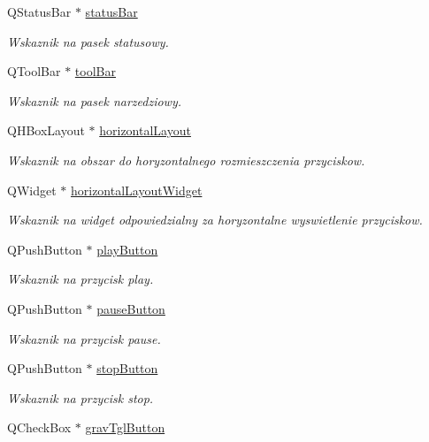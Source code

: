 \begin{DoxyCompactItemize}
Q\-Status\-Bar $\ast$ \hyperlink{class_okno_glowne_a40a10989bc6b318ac24e2457d7adb53b}{status\-Bar}
\begin{DoxyCompactList}\small\item\em Wskaznik na pasek statusowy. \end{DoxyCompactList}\item 
Q\-Tool\-Bar $\ast$ \hyperlink{class_okno_glowne_a6a37dd1f32605092fff7feac712bf429}{tool\-Bar}
\begin{DoxyCompactList}\small\item\em Wskaznik na pasek narzedziowy. \end{DoxyCompactList}\item 
Q\-H\-Box\-Layout $\ast$ \hyperlink{class_okno_glowne_aacb5ddb6d0eb560a47917cc1b457239a}{horizontal\-Layout}
\begin{DoxyCompactList}\small\item\em Wskaznik na obszar do horyzontalnego rozmieszczenia przyciskow. \end{DoxyCompactList}\item 
Q\-Widget $\ast$ \hyperlink{class_okno_glowne_a12ac2d00b9ca186176ccc710a928a723}{horizontal\-Layout\-Widget}
\begin{DoxyCompactList}\small\item\em Wskaznik na widget odpowiedzialny za horyzontalne wyswietlenie przyciskow. \end{DoxyCompactList}\item 
Q\-Push\-Button $\ast$ \hyperlink{class_okno_glowne_a50f936486c1bc3b3278823a8eb90841e}{play\-Button}
\begin{DoxyCompactList}\small\item\em Wskaznik na przycisk play. \end{DoxyCompactList}\item 
Q\-Push\-Button $\ast$ \hyperlink{class_okno_glowne_a0dde8df8a49b8f47f17f8e748fd15967}{pause\-Button}
\begin{DoxyCompactList}\small\item\em Wskaznik na przycisk pause. \end{DoxyCompactList}\item 
Q\-Push\-Button $\ast$ \hyperlink{class_okno_glowne_a3051d73dc0e0a27dc30ada43cc6b63c4}{stop\-Button}
\begin{DoxyCompactList}\small\item\em Wskaznik na przycisk stop. \end{DoxyCompactList}\item 
Q\-Check\-Box $\ast$ \hyperlink{class_okno_glowne_ae6e8681e77286aae1f4025ee5ba1ad69}{grav\-Tgl\-Button}

\end{DoxyCompactItemize}
